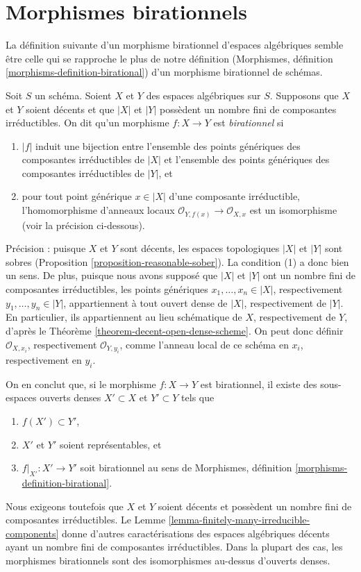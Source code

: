 \section{Morphismes birationnels}
\label{section-birational}

\noindent
La définition suivante d'un morphisme birationnel d'espaces algébriques
semble être celle qui se rapproche le plus de notre définition
(Morphismes, définition \ref{morphisms-definition-birational})
d'un morphisme birationnel de schémas.

\begin{definition}
\label{definition-birational}
Soit $S$ un schéma. Soient $X$ et $Y$ des espaces algébriques sur $S$.
Supposons que $X$ et $Y$ soient décents et que $|X|$ et $|Y|$ possèdent
un nombre fini de composantes irréductibles. On dit qu'un morphisme
$f : X \to Y$ est {\it birationnel} si
\begin{enumerate}
\item $|f|$ induit une bijection entre l'ensemble des points génériques
des composantes irréductibles de $|X|$ et l'ensemble des points génériques
des composantes irréductibles de $|Y|$, et
\item pour tout point générique $x \in |X|$ d'une composante irréductible,
l'homomorphisme d'anneaux locaux
$\mathcal{O}_{Y, f(x)} \to \mathcal{O}_{X, x}$ est un isomorphisme
(voir la précision ci-dessous).
\end{enumerate}
\end{definition}

\noindent
Précision : puisque $X$ et $Y$ sont décents, les espaces topologiques
$|X|$ et $|Y|$ sont sobres
(Proposition \ref{proposition-reasonable-sober}).
La condition (1) a donc bien un sens. De plus, puisque nous avons supposé que
$|X|$ et $|Y|$ ont un nombre fini de composantes irréductibles, les points
génériques $x_1, \ldots, x_n \in |X|$, respectivement
$y_1, \ldots, y_n \in |Y|$, appartiennent à tout ouvert dense de $|X|$,
respectivement de $|Y|$. En particulier, ils appartiennent au lieu schématique
de $X$, respectivement de $Y$, d'après le
Théorème \ref{theorem-decent-open-dense-scheme}.
On peut donc définir $\mathcal{O}_{X, x_i}$, respectivement
$\mathcal{O}_{Y, y_i}$, comme l'anneau local de ce schéma en $x_i$,
respectivement en $y_i$.

\medskip\noindent
On en conclut que, si le morphisme $f : X \to Y$ est birationnel, il existe
des sous-espaces ouverts denses $X' \subset X$ et $Y' \subset Y$ tels que
\begin{enumerate}
\item $f(X') \subset Y'$,
\item $X'$ et $Y'$ soient représentables, et
\item $f|_{X'} : X' \to Y'$ soit birationnel au sens de Morphismes,
définition \ref{morphisms-definition-birational}.
\end{enumerate}
Nous exigeons toutefois que $X$ et $Y$ soient décents et possèdent un nombre
fini de composantes irréductibles. Le
Lemme \ref{lemma-finitely-many-irreducible-components} donne d'autres
caractérisations des espaces algébriques décents ayant un nombre fini de
composantes irréductibles. Dans la plupart des cas, les morphismes
birationnels sont des isomorphismes au-dessus d'ouverts denses.

